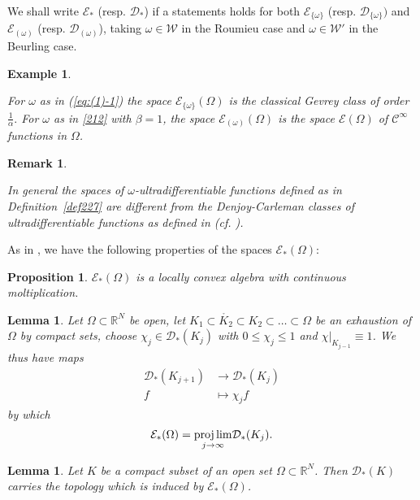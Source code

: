 \documentclass[twoside]{amsart}
\newtheorem{Rem}[Th]{Remark}
\newtheorem{Ex}[Th]{Example}
\newtheorem{Lemma}[Th]{Lemma}
\newtheorem{Prop}[Th]{Proposition}
\begin{document}
We shall write ${\mathcal{E}}_*$ (resp. ${\mathcal{D}}_*$) if a statements holds for both
${\mathcal{E}}_{\{\omega\}}$ (resp. ${\mathcal{D}}_{\{\omega\}})$ and ${\mathcal{E}}_{(\omega)}$ 
(resp. ${\mathcal{D}}_{(\omega)}$), taking $\omega\in{\mathcal{W}}$
in the Roumieu case and $\omega\in{\mathcal{W}}'$ in the Beurling case.

\begin{Ex}
\begin{em}
For $\omega$ as in (\ref{eq:(1)-1}) the space ${\mathcal{E}}_{\{\omega\}}(\Omega)$ is
the classical Gevrey class of order ${\displaystyle \frac{1}{\alpha}.}$
For $\omega$ as in \eqref{212} with $\beta=1$, the
space ${\mathcal{E}}_{(\omega)}(\Omega)$ is the space ${\mathcal{E}}(\Omega)$ of $\mathcal C^\infty$
functions in $\Omega$.
\end{em}
\end{Ex}

\begin{Rem}
  \begin{em}
    In general the spaces of $\omega$-ultradifferentiable functions
    defined as in Definition~\ref{def227} are different from the
    Denjoy-Carleman classes of ultradifferentiable functions as defined
    in \cite{K} (cf. \cite{BMM}).
      \end{em}
  \end{Rem}

As in \cite{BMT}, we have the following properties of the spaces
${\mathcal{E}}_*(\Omega)$:
\begin{Prop}
${\mathcal{E}}_*(\Omega)$ is a locally convex algebra with continuous moltiplication.
\end{Prop}

\begin{Lemma}
Let $\Omega\subset{\mathbb R}^N$ be open, let 
$K_{1}\subset\mathring{K_{2}}\subset K_{2}\subset\ldots\subset\Omega$
be an exhaustion of $\Omega$ by compact sets, choose $\chi_{j}\in{\mathcal{D}}_*(K_{j})$
with $0\leq\chi_{j}\leq1$ and $\left.\chi\right|_{K_{j-1}}\equiv1$.
We thus have maps
\begin{align*}
{\mathcal{D}}_*(K_{j+1}) & \rightarrow{\mathcal{D}}_*(K_{j})\\
f & \mapsto\chi_{j}f
\end{align*}
by which
\[
{\mathcal{E}}_*(\Omega)=\underset{j\rightarrow\infty}{\mathop{\rm proj\,lim}}{\mathcal{D}}_*(K_{j}).
\]
\end{Lemma}

\begin{Lemma}
Let $K$ be a compact subset of an open set $\Omega\subset{\mathbb R}^N$. Then
${\mathcal{D}}_*(K)$ carries the topology which is induced by ${\mathcal{E}}_*(\Omega)$.
\end{Lemma}
\end{document}
